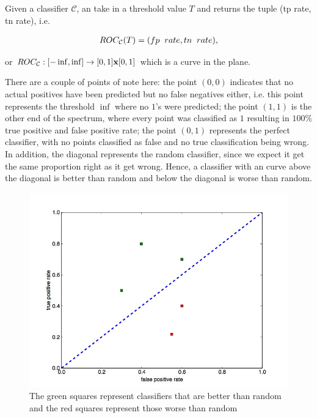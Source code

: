              Given a classifier $\mathcal{C}$, an  take in a threshold value $T$ and returns the tuple (tp rate, tn rate), i.e. 


\begin{align*}
    ROC_{\mathcal{C}}(T) = (fp\hspace{2mm}rate, tn\hspace{2mm}rate), 
\end{align*}


or $ROC_{\mathcal{C}}: [-\inf, \inf] \rightarrow [0,1]{\mathbf{x}}[0,1]$ which is a curve in the plane. 


There are a couple of points of note here: the point $(0,0)$ indicates that no actual positives have been predicted but no false negatives either, i.e. this point represents the threshold $\inf$ where no $1$'s were predicted; the point $(1,1)$ is the other end of the spectrum, where every point was classified as $1$ resulting in $100\%$ true positive and false positive rate; the point $(0,1)$ represents the perfect classifier, with no points classified as false and no true classification being wrong. In addition, the diagonal represents the random classifier, since we expect it get the same proportion right as it get wrong. Hence, a classifier with an  curve above the diagonal is better than random and below the diagonal is worse than random. 
\begin{figure}
  \includegraphics[width=.9\textwidth,height=.45\textheight]{../images/rocRand}
  \caption{The green squares represent classifiers that are better than random and the red squares represent those worse than random}
\end{figure}


